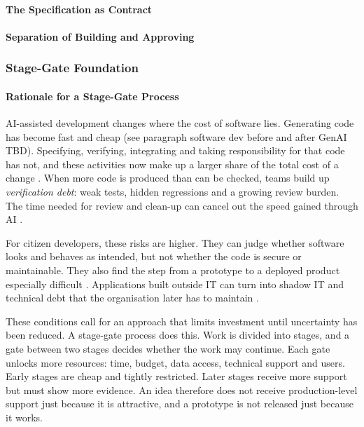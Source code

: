 \documentclass[10pt,a4paper]{article}
\begin{document}
\paragraph{The Specification as Contract}

\paragraph{Separation of Building and Approving}

\subsubsection{Stage-Gate Foundation}

\paragraph{Rationale for a Stage-Gate Process}

AI-assisted development changes where the cost of software lies. Generating code has become fast and cheap (see paragraph software dev before and after GenAI TBD). Specifying, verifying, integrating and taking responsibility for that code has not, and these activities now make up a larger share of the total cost of a change \parencite{wangliu2026}. When more code is produced than can be checked, teams build up \emph{verification debt}: weak tests, hidden regressions and a growing review burden. The time needed for review and clean-up can cancel out the speed gained through AI \parencite{koch2026agentic}.

For citizen developers, these risks are higher. They can judge whether software looks and behaves as intended, but not whether the code is secure or maintainable. They also find the step from a prototype to a deployed product especially difficult \parencite{kobiella2026}. Applications built outside IT can turn into shadow IT and technical debt that the organisation later has to maintain \parencite{viljoen2024}.

These conditions call for an approach that limits investment until uncertainty has been reduced. A stage-gate process does this. Work is divided into stages, and a gate between two stages decides whether the work may continue. Each gate unlocks more resources: time, budget, data access, technical support and users. Early stages are cheap and tightly restricted. Later stages receive more support but must show more evidence. An idea therefore does not receive production-level support just because it is attractive, and a prototype is not released just because it works.
\end{document}
